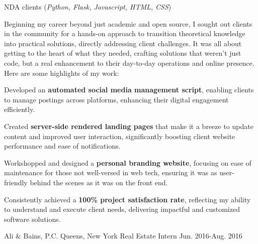 \begin{cventries}
  \cvcustombodydescription
    {NDA clients (\emph{Python, Flask, Javascript, HTML, CSS})}
    {
      \begin{cvtightprose} %
        {Beginning my career beyond just academic and open source, I sought out clients in the community for a hands-on approach to transition theoretical knowledge into practical solutions, directly addressing client challenges. It was all about getting to the heart of what they needed, crafting solutions that weren't just code, but a real enhancement to their day-to-day operations and online presence. Here are some highlights of my work:}
      \end{cvtightprose}
    }
    {
      \begin{cvitems} %
        \item{Developed an \textbf{automated social media management script}, enabling clients to manage postings across platforms, enhancing their digital engagement efficiently.}
        \item{Created \textbf{server-side rendered landing pages} that make it a breeze to update content and improved user interaction, significantly boosting client website performance and ease of notifications.}
        \item{Workshopped and designed a \textbf{personal branding website}, focusing on ease of maintenance for those not well-versed in web tech, ensuring it was as user-friendly behind the scenes as it was on the front end.}
        \item{Consistently achieved a \textbf{100\% project satisfaction rate}, reflecting my ability to understand and execute client needs, delivering impactful and customized software solutions.}
      \end{cvitems}
    }

  \nrolecventrynoitems
    {Ali \& Bains, P.C.} %
    {Queens, New York} %
    {Real Estate Intern} %
    {Jun. 2016-Aug. 2016} %
    {} %
    {} %
    {} %
    {} %


\end{cventries}
